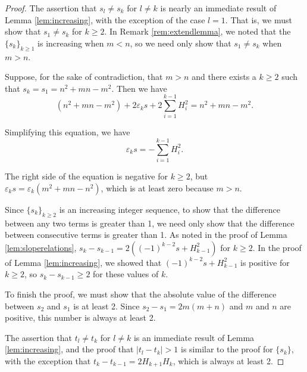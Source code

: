 \documentclass[10pt,a4paper]{amsart}
\begin{document}
\begin{proof}
The assertion that $s_l \neq s_k$ for $l \neq k$ is nearly an immediate result of Lemma \ref{lem:increasing}, with the exception of the case $l=1$. That is, we must show that $s_1 \neq s_k$ for $k\ge 2$. In Remark \ref{rem:extendlemma}, we noted that the $\{s_k\}_{k\ge1}$ is increasing when $m<n$, so we need only show that $s_1 \neq s_k$ when $m>n$. 

Suppose, for the sake of contradiction, that $m>n$ and there exists a $k\ge 2$ such that $s_k = s_1 = n^2 + mn - m^2$. Then we have  $$(n^2+mn -m^2) + 2\varepsilon_k s  + 2\sum_{i=1}^{k-1} H_i^2 = n^2+mn -m^2.$$ 

Simplifying this equation, we have $$  \varepsilon_k s   =  -  \sum_{i=1}^{k-1} H_i^2.$$ 

The right side of the equation is negative for $k\ge 2$, but $\varepsilon_k s = \varepsilon_k(m^2 + mn - n^2)$, which is at least zero because $m>n$. 

Since $\{s_k\}_{k\ge2}$ is an increasing integer sequence, to show that the difference between any two terms is greater than 1, we need only show that the difference between consecutive terms is greater than 1.  
As noted in the proof of Lemma \ref{lem:sloperelations}, $s_k - s_{k-1} = 2((-1)^{k-2} s + H_{k-1}^2)$ for $k\ge 2$. In the proof of Lemma \ref{lem:increasing}, we showed that $(-1)^{k-2} s + H_{k-1}^2$ is positive for $k\ge 2$, so $s_k - s_{k-1} \ge 2$ for these values of $k$.

To finish the proof, we must show that the absolute value of the difference between $s_2$ and $s_1$ is at least 2. Since $s_2 - s_1 = 2m(m+n) $ and $m$ and $n$ are positive, this number is always at least 2.

The assertion that $t_l \neq t_k$ for $l \neq k$ is an immediate result of Lemma \ref{lem:increasing}, and the proof that $|t_l-t_k| >1$ is similar to the proof for $\{s_k\}$, with the exception that $t_k - t_{k-1} = 2H_{k+1}H_k$, which is always at least 2. 
\end{proof}
\end{document}
